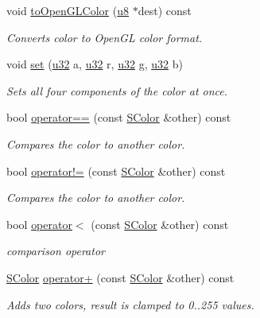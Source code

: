 \begin{DoxyCompactItemize}
void \hyperlink{classirr_1_1video_1_1SColor_a4251509c429bdc125660c59170b50a2e}{to\+Open\+G\+L\+Color} (\hyperlink{namespaceirr_a646874f69af8ff87fc10201b0254a761}{u8} $\ast$dest) const
\begin{DoxyCompactList}\small\item\em Converts color to Open\+GL color format. \end{DoxyCompactList}\item 
void \hyperlink{classirr_1_1video_1_1SColor_a8cf295c05c7406cc249843acbb31ec5f}{set} (\hyperlink{namespaceirr_a0416a53257075833e7002efd0a18e804}{u32} a, \hyperlink{namespaceirr_a0416a53257075833e7002efd0a18e804}{u32} r, \hyperlink{namespaceirr_a0416a53257075833e7002efd0a18e804}{u32} g, \hyperlink{namespaceirr_a0416a53257075833e7002efd0a18e804}{u32} b)
\begin{DoxyCompactList}\small\item\em Sets all four components of the color at once. \end{DoxyCompactList}\item 
bool \hyperlink{classirr_1_1video_1_1SColor_a7042c0433d4b89e6473e9f123f6b35d0}{operator==} (const \hyperlink{classirr_1_1video_1_1SColor}{S\+Color} \&other) const
\begin{DoxyCompactList}\small\item\em Compares the color to another color. \end{DoxyCompactList}\item 
bool \hyperlink{classirr_1_1video_1_1SColor_a2d82eec01be437076044d2330fa80322}{operator!=} (const \hyperlink{classirr_1_1video_1_1SColor}{S\+Color} \&other) const
\begin{DoxyCompactList}\small\item\em Compares the color to another color. \end{DoxyCompactList}\item 
bool \hyperlink{classirr_1_1video_1_1SColor_adf45f90ff13a1eb56b5784a3fba20247}{operator$<$} (const \hyperlink{classirr_1_1video_1_1SColor}{S\+Color} \&other) const
\begin{DoxyCompactList}\small\item\em comparison operator \end{DoxyCompactList}\item 
\hyperlink{classirr_1_1video_1_1SColor}{S\+Color} \hyperlink{classirr_1_1video_1_1SColor_a3de50f1cde7bf3f5b1af79c64cd0cdbd}{operator+} (const \hyperlink{classirr_1_1video_1_1SColor}{S\+Color} \&other) const
\begin{DoxyCompactList}\small\item\em Adds two colors, result is clamped to 0..255 values. \end{DoxyCompactList}\item 

\end{DoxyCompactItemize}
